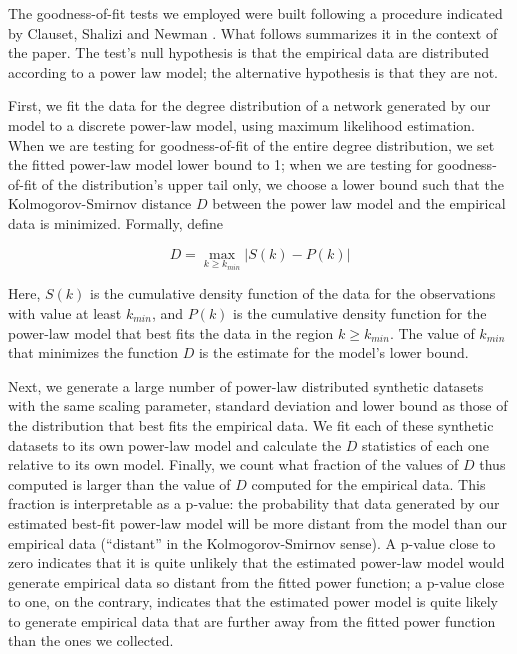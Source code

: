 \documentclass{article}
\begin{document}
The goodness-of-fit tests we employed were built following a procedure indicated by Clauset, Shalizi and Newman \cite[pp. 15-18]{clauset2009power}. What follows summarizes it in the context of the paper. The test's null hypothesis is that the empirical data are distributed according to a power law model; the alternative hypothesis is that they are not.

First, we fit the data for the degree distribution of a network generated by our model to a discrete power-law model, using maximum likelihood estimation. When we are testing for goodness-of-fit of the entire degree distribution, we set the fitted power-law model lower bound to 1; when we are testing for goodness-of-fit of the distribution's upper tail only, we choose a lower bound  such that the Kolmogorov-Smirnov distance $D$ between the power law model and the empirical data is minimized. Formally, define

$$D = \max_{k \geq k_{min}} | S(k) - P(k) |$$

Here, $S(k)$ is the cumulative density function of the data for the observations with value at least $k_{min}$, and $P(k)$ is the cumulative density function for the power-law model that best fits the data in the region $k \geq k_{min}$. The value of $k_{min}$ that minimizes the function $D$ is the estimate for the model's lower bound.

Next, we generate a large number of power-law distributed synthetic datasets with the same scaling parameter, standard deviation and lower bound as those of the distribution that best fits the empirical data. We fit each of these synthetic datasets to its own power-law model and calculate the $D$ statistics of each one relative to its own model. Finally, we count what fraction of the values of $D$ thus computed is larger than the value of $D$ computed for the empirical data. This fraction is interpretable as a p-value: the probability that data generated by our estimated best-fit power-law model will be more distant from the model than our empirical data (``distant'' in the Kolmogorov-Smirnov sense). A p-value close to zero indicates that it is quite unlikely that the estimated power-law model would generate empirical data so distant from the fitted power function; a p-value close to one, on the contrary, indicates that the estimated power model is quite likely to generate empirical data that are further away from the fitted power function than the ones we collected. 
\end{document}
